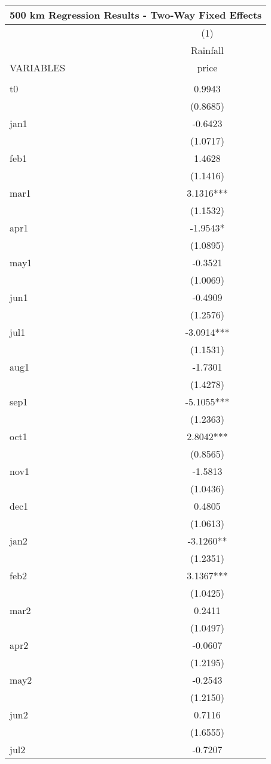 \documentclass[]{article}
\begin{document}
\begin{tabular}{lc}
\multicolumn{2}{c}{\huge 500 km Regression Results - Two-Way Fixed Effects} \\ \hline
 & (1) \\
 & \Large Rainfall \\
VARIABLES & price \\ \hline
 &  \\
t0 & 0.9943 \\
 & (0.8685) \\
jan1 & -0.6423 \\
 & (1.0717) \\
feb1 & 1.4628 \\
 & (1.1416) \\
mar1 & 3.1316*** \\
 & (1.1532) \\
apr1 & -1.9543* \\
 & (1.0895) \\
may1 & -0.3521 \\
 & (1.0069) \\
jun1 & -0.4909 \\
 & (1.2576) \\
jul1 & -3.0914*** \\
 & (1.1531) \\
aug1 & -1.7301 \\
 & (1.4278) \\
sep1 & -5.1055*** \\
 & (1.2363) \\
oct1 & 2.8042*** \\
 & (0.8565) \\
nov1 & -1.5813 \\
 & (1.0436) \\
dec1 & 0.4805 \\
 & (1.0613) \\
jan2 & -3.1260** \\
 & (1.2351) \\
feb2 & 3.1367*** \\
 & (1.0425) \\
mar2 & 0.2411 \\
 & (1.0497) \\
apr2 & -0.0607 \\
 & (1.2195) \\
may2 & -0.2543 \\
 & (1.2150) \\
jun2 & 0.7116 \\
 & (1.6555) \\
jul2 & -0.7207 \\

\end{tabular}
\end{document}
